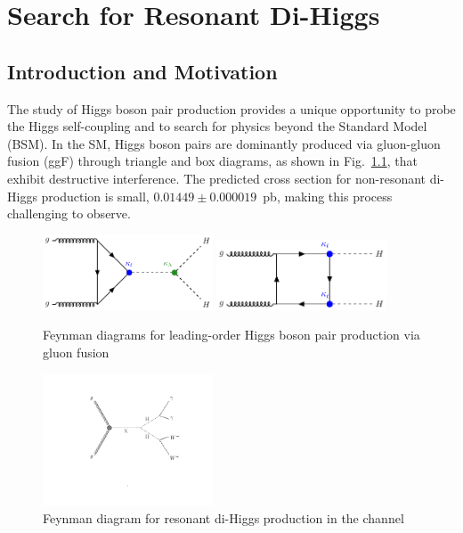 \chapter{Search for Resonant Di-Higgs }
\label{ch:diHiggs_search}


\section{Introduction and Motivation}
The study of Higgs boson pair production provides a unique opportunity to probe the Higgs self-coupling and to search for physics
beyond the Standard Model (BSM). In the SM, Higgs boson pairs are dominantly produced via gluon-gluon fusion (ggF) through triangle
and box diagrams, as shown in Fig.~\ref{SMLO_ggHH_production}, that exhibit destructive interference.
The predicted cross section for non-resonant di-Higgs production is small, \(0.01449 \pm 0.000019\)~pb,
making this process challenging to observe.
\begin{figure}[!htbp]
    \begin{center}
        \includegraphics[width=0.45\textwidth]{figures/diHiggsSearches/fey_HH_Triangle.pdf} %
        \includegraphics[width=0.45\textwidth]{figures/diHiggsSearches/fey_HH_Box.pdf}
    \end{center}
    \caption{Feynman diagrams for leading-order Higgs boson pair production via gluon fusion}
    \label{SMLO_ggHH_production}
\end{figure}
\begin{figure}[!htbp]
    \begin{center}
        \includegraphics[width=0.45\textwidth]{figures/diHiggsSearches/fey_XHH_HHWWgg.pdf}
    \end{center}
    \caption{Feynman diagram for resonant di-Higgs production in the \HH channel}
    \label{XHHFeynmanDiagram}
\end{figure}


